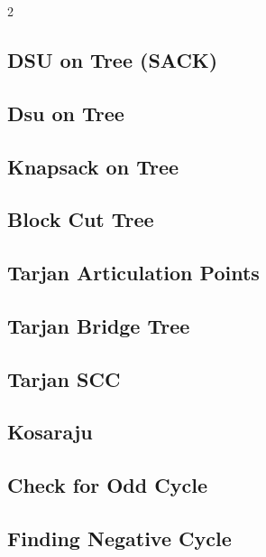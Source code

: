 \documentclass[10pt,a4paper]{extarticle}
\begin{document}
\begin{landscape}
\begin{multicols}{2}
\subsection{DSU on Tree (SACK)}


\subsection{Dsu on Tree}


\subsection{Knapsack on Tree}


\subsection{Block Cut Tree}


\subsection{Tarjan Articulation Points}


\subsection{Tarjan Bridge Tree}


\subsection{Tarjan SCC}


\subsection{Kosaraju}


\subsection{Check for Odd Cycle}


\subsection{Finding Negative Cycle}



\end{multicols}
\end{landscape}
\end{document}
